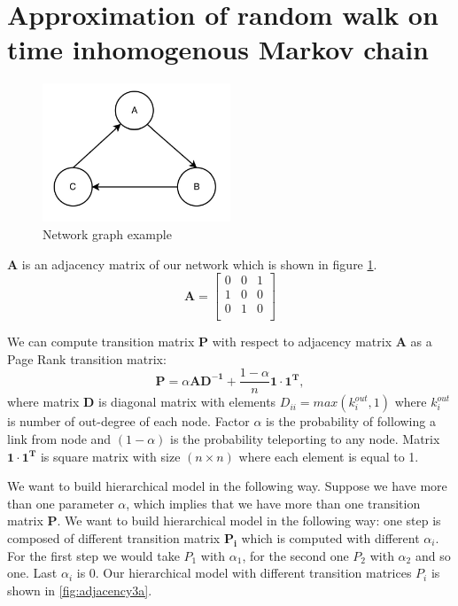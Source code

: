 \documentclass{article}
\begin{document}
\section{Approximation of random walk on time inhomogenous Markov chain}
\begin{figure}
\centering
\includegraphics[width=0.5\textwidth]{simple_adjacency}
\caption{Network graph example}
\label{fig:adjacency_1}
\end{figure}

$\mathbf{A}$ is an adjacency matrix of our network which is shown in figure \ref{fig:adjacency_1}.
\[\mathbf{A}=
\begin{bmatrix}
    0 & 0 & 1 \\
    1 & 0 & 0  \\
    0 & 1 & 0 \\
\end{bmatrix}
\]

We can compute transition matrix $\mathbf{P}$ with respect to adjacency matrix $\mathbf{A}$ as a Page Rank transition matrix:
$$\mathbf{P} = \alpha \mathbf{A}\mathbf{D^{-1}} + \frac{1- \alpha}{n} \mathbf{1}\cdot \mathbf{1^T}, $$ where matrix $\mathbf{D}$ is diagonal matrix with elements $D_{ii} = max(k_{i}^{out}, 1)$ where $k_{i}^{out}$ is number of out-degree of each node. Factor $\alpha$ is the probability of following a link from node and $(1 - \alpha)$ is the probability teleporting to any node. Matrix $\mathbf{1}\cdot \mathbf{1^T}$ is square matrix with size $(n\times n)$ where each element is equal to 1.

We want to build hierarchical model in the following way. Suppose we have more than one parameter $\alpha$, which implies that we have more than one transition matrix $\mathbf{P}$. We want to build hierarchical model in the following way: one step is composed of different transition matrix $\mathbf{P_i}$ which is computed with different $\alpha_i$. For the first step we would take $P_1$ with $\alpha_1$, for the second one $P_2$ with $\alpha_2$ and so one. Last $\alpha_i$ is 0. Our hierarchical model with different transition matrices $P_i$ is shown in \ref{fig:adjacency3a}.
\end{document}
